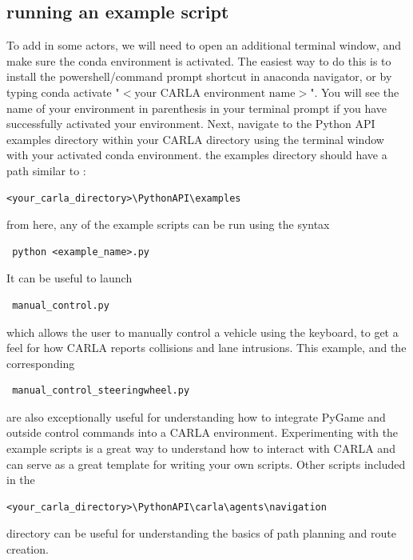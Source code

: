 \documentclass[12pt,oneside,letterpaper]{article}
\begin{document}
\subsection{running an example script}
To add in some actors, we will need to open an additional terminal window, and make sure the conda environment is activated. The easiest way to do this is to install the powershell/command prompt shortcut in anaconda navigator, or by typing conda activate "$<\text{your CARLA environment name}>$". You will see the name of your environment in parenthesis in your terminal prompt if you have successfully activated your environment. Next, navigate to the Python API examples directory within your CARLA directory using the terminal window with your activated conda environment. the examples directory should have a path similar to :
\begin{verbatim}<your_carla_directory>\PythonAPI\examples  \end{verbatim}
from here, any of the example scripts can be run using the syntax \begin{verbatim} python <example_name>.py \end{verbatim} 
It can be useful to launch \begin{verbatim} manual_control.py \end{verbatim} which allows the user to manually control a vehicle using the keyboard, to get a feel for how CARLA reports collisions and lane intrusions. This example, and the corresponding \begin{verbatim} manual_control_steeringwheel.py \end{verbatim} are also exceptionally useful for understanding how to integrate PyGame and outside control commands into a CARLA environment.
Experimenting with the example scripts is a great way to understand how to interact with CARLA and can serve as a great template for writing your own scripts. Other scripts included in the  \begin{verbatim}<your_carla_directory>\PythonAPI\carla\agents\navigation  \end{verbatim} directory can be useful for understanding the basics of path planning and route creation.
\end{document}
